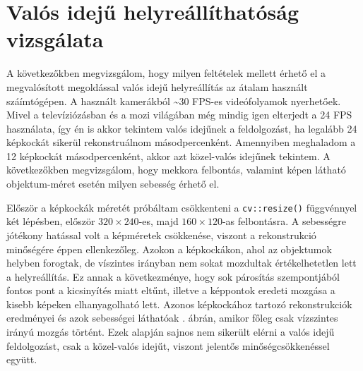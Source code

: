 \section{Valós idejű helyreállíthatóság vizsgálata}

A következőkben megvizsgálom, hogy milyen feltételek mellett érhető el a megvalósított megoldással valós idejű helyreállítás az átalam használt száímtógépen. A használt kamerákból \textasciitilde 30 FPS-es videófolyamok nyerhetőek. Mivel a televíziózásban és a mozi világában még mindig igen elterjedt a 24 FPS használata, így én is akkor tekintem valós idejűnek a feldolgozást, ha legalább 24 képkockát sikerül rekonstruálnom másodpercenként. Amennyiben meghaladom a 12 képkockát másodpercenként, akkor azt közel-valós idejűnek tekintem. A következőkben megvizsgálom, hogy mekkora felbontás, valamint képen látható objektum-méret esetén milyen sebesség érhető el.

Először a képkockák méretét próbáltam csökkenteni a \texttt{cv::resize()} függvénnyel két lépésben, először $320\times 240$-es, majd $160\times 120$-as felbontásra. A sebességre jótékony hatással volt a képméretek csökkenése, viszont a rekonstrukció minőségére éppen ellenkezőleg. Azokon a képkockákon, ahol az objektumok helyben forogtak, de víszintes irányban nem sokat mozdultak értékelhetetlen lett a helyreállítás. Ez annak a következménye, hogy sok párosítás szempontjából fontos pont a kicsinyítés miatt eltűnt, illetve a képpontok eredeti mozgása a kisebb képeken elhanyagolható lett. Azonos képkockához tartozó rekonstrukciók eredményei és azok sebességei láthatóak . ábrán, amikor főleg csak vízszintes irányú mozgás történt. Ezek alapján sajnos nem sikerült elérni a valós idejű feldolgozást, csak a közel-valós idejűt, viszont jelentős minőségcsökkenéssel együtt.

